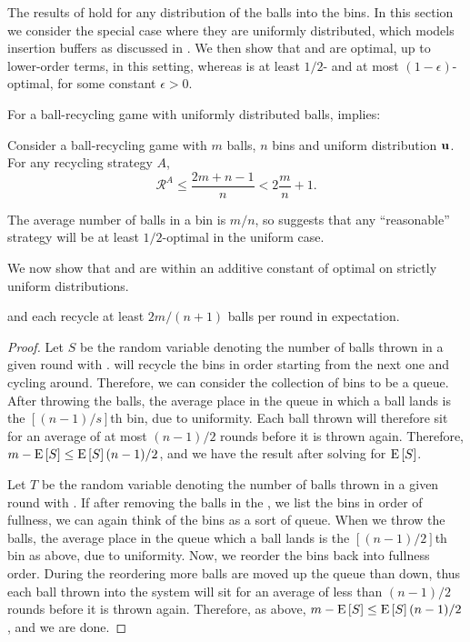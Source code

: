 

The results of  hold for any distribution of the balls
into the bins. In this section we consider the special case where they are
uniformly distributed, which models insertion buffers as discussed in
.  We then show that \GG and \FB are optimal, up to
lower-order terms, in this setting, whereas \RB is at least $1/2$- and at most
$(1-\epsilon)$-optimal, for some constant $\epsilon>0$.

For a ball-recycling game with uniformly distributed balls,
 implies:
\begin{corollary}\label{cor:uniformupperbound}
	Consider a ball-recycling game with $m$ balls, $n$ bins and uniform
	distribution $\mathbf{u}$. For any recycling strategy $A$, 
	\[\mathcal{R}^A \leq \frac{2m+n-1}{n} < 2\frac{m}{n} + 1.\]
\end{corollary}

The average number of balls in a bin is $m/n$, so 
suggests that any ``reasonable'' strategy will be at least $1/2$-optimal in the
uniform case.

We now show that \GG and \FB are within an additive constant of optimal on strictly
uniform distributions.

\begin{lemma}\label{lem:unilowerbound}
	\GG and \FB each recycle at least $2m/(n+1)$ balls per round in
	expectation.
\end{lemma}

\begin{proof}
	Let $S$ be the random variable denoting the number of balls thrown in a
	given round with \GG. \GG will recycle the bins in order starting from the
	next one and cycling around. Therefore, we can consider the collection of
	bins to be a queue. After throwing the balls, the average place in the
	queue in which a ball lands is the $\left[(n-1)/s\right]$th bin, due to
	uniformity. Each ball thrown will therefore sit for an average of at most
	$(n-1)/2$ rounds before it is thrown again. Therefore,
	$m-\mathrm{E}\left[S\right]\leq\mathrm{E}\left[S\right](n-1)/2$, and we have the result after solving for
	$\mathrm{E}\left[S\right]$.

	Let $T$ be the random variable denoting the number of balls thrown in a
	given round with \FB. If after removing the balls in the \FB, we list the
	bins in order of fullness, we can again think of the bins as a sort of
	queue.  When we throw the balls, the average place in the queue which a
	ball lands is the $\left[(n-1)/2\right]$th bin as above, due to uniformity.
	Now, we reorder the bins back into fullness order.  During the reordering
	more balls are moved up the queue than down, thus each ball thrown into the
	system will sit for an average of less than $(n-1)/2$ rounds before it is
	thrown again. Therefore, as above, $m-\mathrm{E}\left[S\right]\leq\mathrm{E}\left[S\right](n-1)/2$, and we are
	done.
\end{proof}

